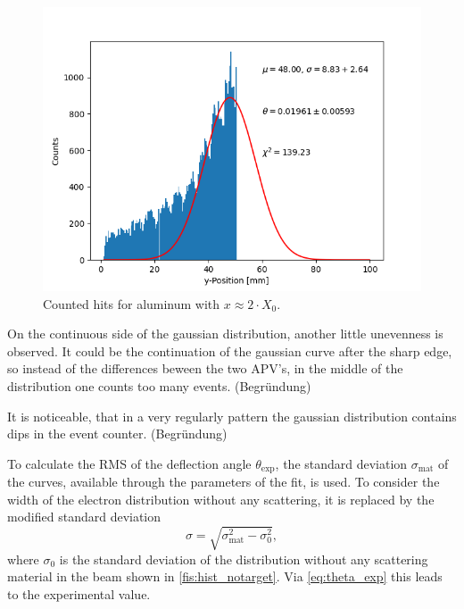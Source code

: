 \documentclass[sn-mathphys-num,iicol]{sn-jnl}
\theoremstyle{thmstyleone}
\theoremstyle{thmstyletwo}
\theoremstyle{thmstylethree}
\begin{document}
\begin{figure}
  \includegraphics[width=0.9\linewidth]{../src/elsa/finished_plots/Aluminium, Two Radiation Lengths, 40cm Distance.png}
  \caption{Counted hits for aluminum with $x\approx2\cdot X_0$.}
  \label{fig:2alu}
\end{figure}

On the continuous side of the gaussian distribution, another little unevenness is observed.
It could be the continuation of the gaussian curve after the sharp edge, so instead of the differences beween the two APV's, in the middle of the distribution one counts too many events. (Begründung)


It is noticeable, that in a very regularly pattern the gaussian distribution contains dips in the event counter. (Begründung)

To calculate the RMS of the deflection angle $\theta_\text{exp}$, the standard deviation $\sigma_\text{mat}$ of the curves, available through the parameters of the fit, is used. To consider the width of the electron distribution without any scattering, it is replaced by the modified standard deviation
\begin{equation} \label{eq:sigma_mod}
  \sigma = \sqrt{\sigma_\text{mat}^2 - \sigma_\text{0}^2},
\end{equation}
where $\sigma_\text{0}$ is the standard deviation of the distribution without any scattering material in the beam shown in \autoref{fis:hist_notarget}. 
Via \autoref{eq:theta_exp} this leads to the experimental value.
\end{document}
